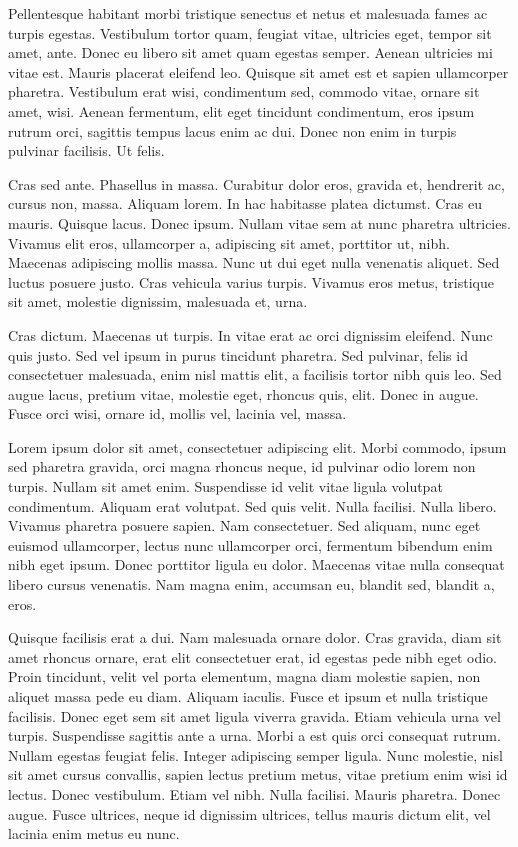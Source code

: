 Pellentesque habitant morbi tristique senectus et netus et malesuada fames ac
turpis egestas. Vestibulum tortor quam, feugiat vitae, ultricies eget, tempor
sit amet, ante. Donec eu libero sit amet quam egestas semper. Aenean ultricies
mi vitae est. Mauris placerat eleifend leo. Quisque sit amet est et sapien
ullamcorper pharetra. Vestibulum erat wisi, condimentum sed, commodo vitae,
ornare sit amet, wisi. Aenean fermentum, elit eget tincidunt condimentum, eros
ipsum rutrum orci, sagittis tempus lacus enim ac dui. Donec non enim in turpis
pulvinar facilisis. Ut felis.

Cras sed ante. Phasellus in massa. Curabitur dolor eros, gravida et, hendrerit
ac, cursus non, massa. Aliquam lorem. In hac habitasse platea dictumst. Cras eu
mauris. Quisque lacus. Donec ipsum. Nullam vitae sem at nunc pharetra
ultricies. Vivamus elit eros, ullamcorper a, adipiscing sit amet, porttitor ut,
nibh. Maecenas adipiscing mollis massa. Nunc ut dui eget nulla venenatis
aliquet. Sed luctus posuere justo. Cras vehicula varius turpis. Vivamus eros
metus, tristique sit amet, molestie dignissim, malesuada et, urna.

Cras dictum. Maecenas ut turpis. In vitae erat ac orci dignissim eleifend. Nunc
quis justo. Sed vel ipsum in purus tincidunt pharetra. Sed pulvinar, felis id
consectetuer malesuada, enim nisl mattis elit, a facilisis tortor nibh quis
leo. Sed augue lacus, pretium vitae, molestie eget, rhoncus quis, elit. Donec
in augue. Fusce orci wisi, ornare id, mollis vel, lacinia vel, massa.

Lorem ipsum dolor sit amet, consectetuer adipiscing elit. Morbi commodo, ipsum
sed pharetra gravida, orci magna rhoncus neque, id pulvinar odio lorem non
turpis. Nullam sit amet enim. Suspendisse id velit vitae ligula volutpat
condimentum. Aliquam erat volutpat. Sed quis velit. Nulla facilisi. Nulla
libero. Vivamus pharetra posuere sapien. Nam consectetuer. Sed aliquam, nunc
eget euismod ullamcorper, lectus nunc ullamcorper orci, fermentum bibendum enim
nibh eget ipsum. Donec porttitor ligula eu dolor. Maecenas vitae nulla
consequat libero cursus venenatis. Nam magna enim, accumsan eu, blandit sed,
blandit a, eros.

Quisque facilisis erat a dui. Nam malesuada ornare dolor. Cras gravida, diam
sit amet rhoncus ornare, erat elit consectetuer erat, id egestas pede nibh eget
odio. Proin tincidunt, velit vel porta elementum, magna diam molestie sapien,
non aliquet massa pede eu diam. Aliquam iaculis. Fusce et ipsum et nulla
tristique facilisis. Donec eget sem sit amet ligula viverra gravida. Etiam
vehicula urna vel turpis. Suspendisse sagittis ante a urna. Morbi a est quis
orci consequat rutrum. Nullam egestas feugiat felis. Integer adipiscing semper
ligula. Nunc molestie, nisl sit amet cursus convallis, sapien lectus pretium
metus, vitae pretium enim wisi id lectus. Donec vestibulum. Etiam vel nibh.
Nulla facilisi. Mauris pharetra. Donec augue. Fusce ultrices, neque id
dignissim ultrices, tellus mauris dictum elit, vel lacinia enim metus eu nunc.

